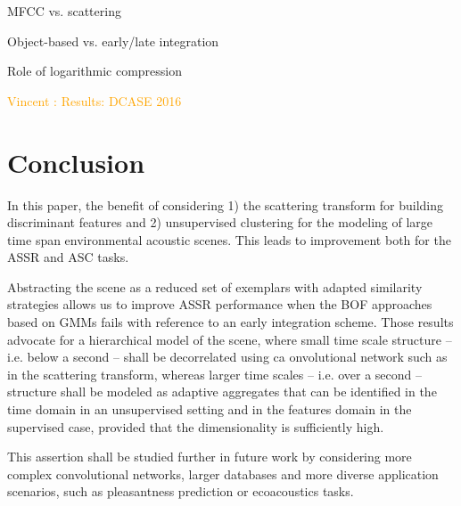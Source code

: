 \documentclass[journal]{IEEEtran}
\makeatletter
\newcommand*{\ie}{i.e.\@\xspace}
\newcommand*{\vs}{vs.\@\xspace}
\newcommand{\vl}[1]{\textcolor{orange}{Vincent : #1}}
\makeatother
\begin{document}
MFCC \vs scattering

Object-based \vs early/late integration

Role of logarithmic compression

\vl{Results: DCASE 2016}

\section{Conclusion}

In this paper, the benefit of considering 1) the scattering transform for building discriminant features and 2) unsupervised clustering for the modeling of large time span environmental acoustic scenes.
This leads to improvement both for the ASSR and ASC tasks.

Abstracting the scene as a reduced set of exemplars with adapted similarity strategies allows us to improve ASSR performance when the BOF approaches based on GMMs fails with reference to an early integration scheme. Those results advocate for a hierarchical model of the scene, where small time scale structure -- \ie below a second -- shall be decorrelated using ca onvolutional network such as in the scattering transform, whereas larger time scales -- \ie over a second -- structure shall be modeled as adaptive aggregates that can be identified in the time domain in an unsupervised setting and in the features domain in the supervised case, provided that the dimensionality is sufficiently high.

This assertion shall be studied further in future work by considering more complex convolutional networks, larger databases and more diverse application scenarios, such as pleasantness prediction \cite{lafaySoundscapePilot, lafay:hal-01111782} or ecoacoustics tasks.




% 

\end{document}
